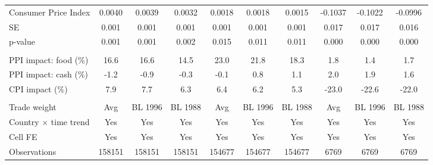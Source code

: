 {\begin{tabular}{l*{9}{c}}
\\ Consumer Price Index&      0.0040         &      0.0039         &      0.0032         &      0.0018         &      0.0018         &      0.0015         &     -0.1037         &     -0.1022         &     -0.0996         \\
\hspace{15pt} SE    &       0.001         &       0.001         &       0.001         &       0.001         &       0.001         &       0.001         &       0.017         &       0.017         &       0.016         \\
\hspace{15pt} p-value&       0.001         &       0.001         &       0.002         &       0.015         &       0.011         &       0.011         &       0.000         &       0.000         &       0.000         \\
\hline \\ PPI impact: food (\%)&        16.6         &        16.6         &        14.5         &        23.0         &        21.8         &        18.3         &         1.8         &         1.4         &         1.7         \\
PPI impact: cash (\%)&        -1.2         &        -0.9         &        -0.3         &        -0.1         &         0.8         &         1.1         &         2.0         &         1.9         &         1.6         \\
CPI impact (\%)     &         7.9         &         7.7         &         6.3         &         6.4         &         6.2         &         5.3         &       -23.0         &       -22.6         &       -22.0         \\
\hline \\ Trade weight&         Avg         &     BL 1996         &     BL 1988         &         Avg         &     BL 1996         &     BL 1988         &         Avg         &     BL 1996         &     BL 1988         \\
Country $\times$ time trend&         Yes         &         Yes         &         Yes         &         Yes         &         Yes         &         Yes         &         Yes         &         Yes         &         Yes         \\
Cell FE             &         Yes         &         Yes         &         Yes         &         Yes         &         Yes         &         Yes         &         Yes         &         Yes         &         Yes         \\
Observations        &      158151         &      158151         &      158151         &      154677         &      154677         &      154677         &        6769         &        6769         &        6769         \\
\hline\hline
\end{tabular}
}
